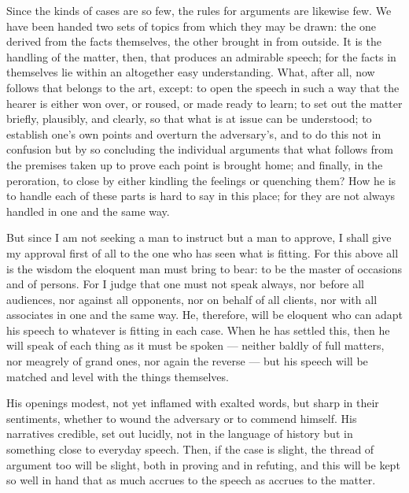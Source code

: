  Since the kinds of cases are so few, the rules for arguments are likewise few. We have been handed two sets of topics from which they may be drawn: the one derived from the facts themselves, the other brought in from outside. It is the handling of the matter, then, that produces an admirable speech; for the facts in themselves lie within an altogether easy understanding. What, after all, now follows that belongs to the art, except: to open the speech in such a way that the hearer is either won over, or roused, or made ready to learn; to set out the matter briefly, plausibly, and clearly, so that what is at issue can be understood; to establish one's own points and overturn the adversary's, and to do this not in confusion but by so concluding the individual arguments that what follows from the premises taken up to prove each point is brought home; and finally, in the peroration, to close by either kindling the feelings or quenching them? How he is to handle each of these parts is hard to say in this place; for they are not always handled in one and the same way.

 But since I am not seeking a man to instruct but a man to approve, I shall give my approval first of all to the one who has seen what is fitting. For this above all is the wisdom the eloquent man must bring to bear: to be the master of occasions and of persons. For I judge that one must not speak always, nor before all audiences, nor against all opponents, nor on behalf of all clients, nor with all associates in one and the same way. He, therefore, will be eloquent who can adapt his speech to whatever is fitting in each case. When he has settled this, then he will speak of each thing as it must be spoken — neither baldly of full matters, nor meagrely of grand ones, nor again the reverse — but his speech will be matched and level with the things themselves.

 His openings modest, not yet inflamed with exalted words, but sharp in their sentiments, whether to wound the adversary or to commend himself. His narratives credible, set out lucidly, not in the language of history but in something close to everyday speech. Then, if the case is slight, the thread of argument too will be slight, both in proving and in refuting, and this will be kept so well in hand that as much accrues to the speech as accrues to the matter.

